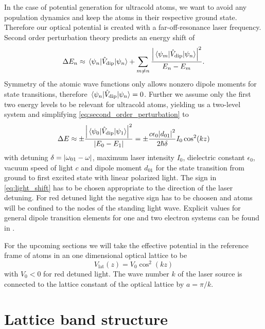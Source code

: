 In the case of potential generation for ultracold atoms, we want to avoid any
population dynamics and keep the atoms in their respective ground state.
Therefore our optical potential is created with a far-off-resonance laser
frequency. Second order perturbation theory predicts an energy shift of
\begin{equation}
  \Delta E_n
  \approx
  \mel{\psi_n}{\hat{V}_\text{dip}}{\psi_n}
  +
  \sum_{m\neq n}\frac{\abs{\mel{\psi_m}{\hat{V}_\text{dip}}{\psi_n}}^2}{E_n-E_m}
  \label{eq:second_order_perturbation}.
\end{equation}
Symmetry of the atomic wave functions only allows nonzero dipole moments for
state transitions, therefore $\mel{\psi_n}{\hat{V}_\text{dip}}{\psi_n}=0$.
Further we assume only the first two energy levels to be relevant for
ultracold atoms, yielding us a two-level system and simplifying
\cref{eq:second_order_perturbation} to
\begin{equation}
  \Delta E
  \approx
  \pm\frac{\abs{\mel{\psi_0}{\hat{V}_\text{dip}}{\psi_1}}^2}{\abs{E_0-E_1}}
  =
  \pm\frac{c\epsilon_0 \abs{d_{01}}^2}{2\hbar\delta}I_0\cos^2(kz)
  \label{eq:light_shift}
\end{equation}
with detuning $\delta=\abs{\omega_{01}-\omega}$, maximum laser intensity
$I_0$, dielectric constant $\epsilon_0$, vacuum speed of light $c$ and dipole
moment $d_{01}$ for the state transition from ground to first excited state
with linear polarized light. The sign in \cref{eq:light_shift} has to be
chosen appropriate to the direction of the laser detuning. For red detuned
light the negative sign has to be choosen and atoms will be confined to the
nodes of the standing light wave. Explicit values for general dipole
transition elements for one and two electron systems can be found in
\cite{Bethe1957}.

For the upcoming sections we will take the effective potential in the reference
frame of atoms in an one dimensional optical lattice to be
\begin{equation}
  V_\text{lat}(z)=V_0\cos^2(kz)
  \label{eq:potential_lattice}
\end{equation}
with $V_0<0$ for red detuned light. The wave number $k$ of the laser source
is connected to the lattice constant of the optical lattice by
$a=\pi/k$.

\section{Lattice band structure}

